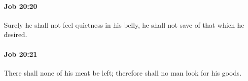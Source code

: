 		\paragraph{Job 20:20} %
			\label{JOB-20-20}

			Surely he shall not feel quietness in his belly, he shall not save of that which he desired.


		\paragraph{Job 20:21} %
			\label{JOB-20-21}

			There shall none of his meat be left; therefore shall no man look for his goods.


